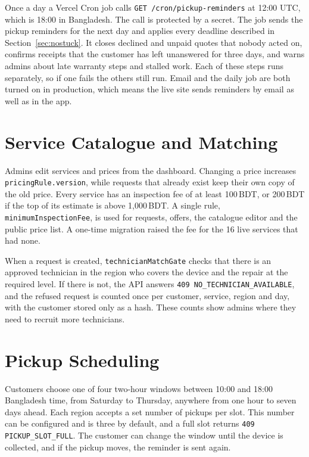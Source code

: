 \documentclass{standalone}
\begin{document}
Once a day a Vercel Cron job calls \texttt{GET /cron/pickup-reminders} at 12:00 UTC, which is 18:00 in Bangladesh. The call is protected by a secret. The job sends the pickup reminders for the next day and applies every deadline described in Section~\ref{sec:nostuck}. It closes declined and unpaid quotes that nobody acted on, confirms receipts that the customer has left unanswered for three days, and warns admins about late warranty steps and stalled work. Each of these steps runs separately, so if one fails the others still run. Email and the daily job are both turned on in production, which means the live site sends reminders by email as well as in the app.

\section{Service Catalogue and Matching}
Admins edit services and prices from the dashboard. Changing a price increases \texttt{pricingRule.version}, while requests that already exist keep their own copy of the old price. Every service has an inspection fee of at least 100\,BDT, or 200\,BDT if the top of its estimate is above 1,000\,BDT. A single rule, \texttt{minimumInspectionFee}, is used for requests, offers, the catalogue editor and the public price list. A one-time migration raised the fee for the 16 live services that had none.

When a request is created, \texttt{technicianMatchGate} checks that there is an approved technician in the region who covers the device and the repair at the required level. If there is not, the API answers \texttt{409 NO\_TECHNICIAN\_AVAILABLE}, and the refused request is counted once per customer, service, region and day, with the customer stored only as a hash. These counts show admins where they need to recruit more technicians.

\section{Pickup Scheduling}
Customers choose one of four two-hour windows between 10:00 and 18:00 Bangladesh time, from Saturday to Thursday, anywhere from one hour to seven days ahead. Each region accepts a set number of pickups per slot. This number can be configured and is three by default, and a full slot returns \texttt{409 PICKUP\_SLOT\_FULL}. The customer can change the window until the device is collected, and if the pickup moves, the reminder is sent again.
\end{document}
